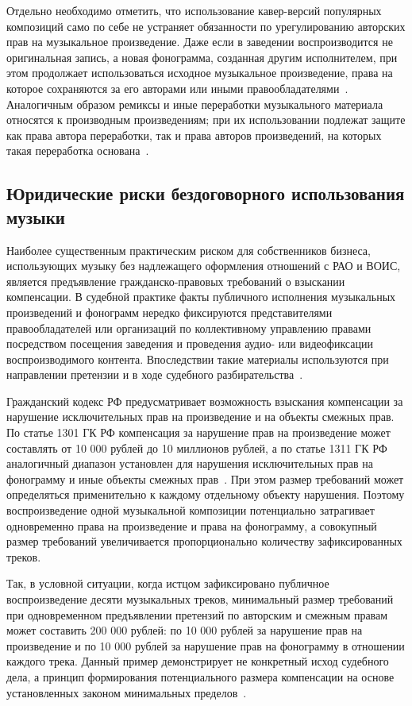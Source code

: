 Отдельно необходимо отметить, что использование кавер-версий популярных композиций само по себе не устраняет обязанности по урегулированию авторских прав на музыкальное произведение. Даже если в заведении воспроизводится не оригинальная запись, а новая фонограмма, созданная другим исполнителем, при этом продолжает использоваться исходное музыкальное произведение, права на которое сохраняются за его авторами или иными правообладателями~\cite{gk_rf_1270,gk_rf_1260}. Аналогичным образом ремиксы и иные переработки музыкального материала относятся к производным произведениям; при их использовании подлежат защите как права автора переработки, так и права авторов произведений, на которых такая переработка основана~\cite{gk_rf_1260}.

\subsection{Юридические риски бездоговорного использования музыки}

Наиболее существенным практическим риском для собственников бизнеса, использующих музыку без надлежащего оформления отношений с РАО и ВОИС, является предъявление гражданско-правовых требований о взыскании компенсации. В судебной практике факты публичного исполнения музыкальных произведений и фонограмм нередко фиксируются представителями правообладателей или организаций по коллективному управлению правами посредством посещения заведения и проведения аудио- или видеофиксации воспроизводимого контента. Впоследствии такие материалы используются при направлении претензии и в ходе судебного разбирательства~\cite{sudact_a19_2521_2025}.

Гражданский кодекс РФ предусматривает возможность взыскания компенсации за нарушение исключительных прав на произведение и на объекты смежных прав. По статье 1301 ГК РФ компенсация за нарушение прав на произведение может составлять от 10 000 рублей до 10 миллионов рублей, а по статье 1311 ГК РФ аналогичный диапазон установлен для нарушения исключительных прав на фонограмму и иные объекты смежных прав~\cite{gk_rf_1301,gk_rf_1311}. При этом размер требований может определяться применительно к каждому отдельному объекту нарушения. Поэтому воспроизведение одной музыкальной композиции потенциально затрагивает одновременно права на произведение и права на фонограмму, а совокупный размер требований увеличивается пропорционально количеству зафиксированных треков.

Так, в условной ситуации, когда истцом зафиксировано публичное воспроизведение десяти музыкальных треков, минимальный размер требований при одновременном предъявлении претензий по авторским и смежным правам может составить 200 000 рублей: по 10 000 рублей за нарушение прав на произведение и по 10 000 рублей за нарушение прав на фонограмму в отношении каждого трека. Данный пример демонстрирует не конкретный исход судебного дела, а принцип формирования потенциального размера компенсации на основе установленных законом минимальных пределов~\cite{gk_rf_1301,gk_rf_1311}.

